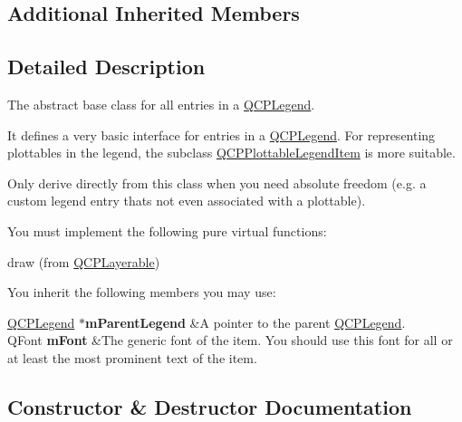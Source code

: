 \subsection*{Additional Inherited Members}


\subsection{Detailed Description}
The abstract base class for all entries in a \hyperlink{classQCPLegend}{Q\+C\+P\+Legend}. 

It defines a very basic interface for entries in a \hyperlink{classQCPLegend}{Q\+C\+P\+Legend}. For representing plottables in the legend, the subclass \hyperlink{classQCPPlottableLegendItem}{Q\+C\+P\+Plottable\+Legend\+Item} is more suitable.

Only derive directly from this class when you need absolute freedom (e.\+g. a custom legend entry that\textquotesingle{}s not even associated with a plottable).

You must implement the following pure virtual functions\+: \begin{DoxyItemize}
\item draw (from \hyperlink{classQCPLayerable}{Q\+C\+P\+Layerable})\end{DoxyItemize}
You inherit the following members you may use\+: \begin{TabularC}{2}
\hline
\hyperlink{classQCPLegend}{Q\+C\+P\+Legend} $\ast${\bfseries m\+Parent\+Legend}  &A pointer to the parent \hyperlink{classQCPLegend}{Q\+C\+P\+Legend}. \\
Q\+Font {\bfseries m\+Font}  &The generic font of the item. You should use this font for all or at least the most prominent text of the item.  \\
\end{TabularC}


\subsection{Constructor \& Destructor Documentation}
\hypertarget{classQCPAbstractLegendItem_afaff87610e8da0fa238ecf552872d774}{}
